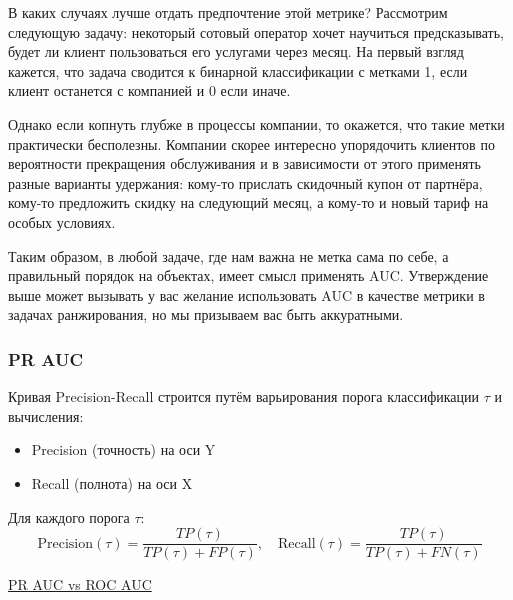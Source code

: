 В каких случаях лучше отдать предпочтение этой метрике?
Рассмотрим следующую задачу: некоторый сотовый оператор хочет научиться предсказывать, будет ли клиент пользоваться
его услугами через месяц.
На первый взгляд кажется, что задача сводится к бинарной классификации с метками 1, если клиент останется с компанией и
0 если иначе.

Однако если копнуть глубже в процессы компании, то окажется, что такие метки практически бесполезны.
Компании скорее интересно упорядочить клиентов по вероятности прекращения обслуживания и в зависимости от этого
применять разные варианты удержания: кому-то прислать скидочный купон от партнёра, кому-то предложить скидку на
следующий месяц, а кому-то и новый тариф на особых условиях.

Таким образом, в любой задаче, где нам важна не метка сама по себе, а правильный порядок на объектах, имеет смысл
применять AUC\@.
Утверждение выше может вызывать у вас желание использовать AUC в качестве метрики в задачах ранжирования, но мы
призываем вас быть аккуратными.

\subsubsection{PR AUC}

\begin{definition}[PR кривая]
    Кривая Precision-Recall строится путём варьирования порога классификации $\tau$ и вычисления:
    \begin{itemize}
        \item Precision (точность) на оси Y
        \item Recall (полнота) на оси X
    \end{itemize}
    Для каждого порога $\tau$:
    \[ \text{Precision}(\tau) = \frac{TP(\tau)}{TP(\tau) + FP(\tau)}, \quad
        \text{Recall}(\tau) = \frac{TP(\tau)}{TP(\tau) + FN(\tau)} \]
\end{definition}

\underline{PR AUC vs ROC AUC}

